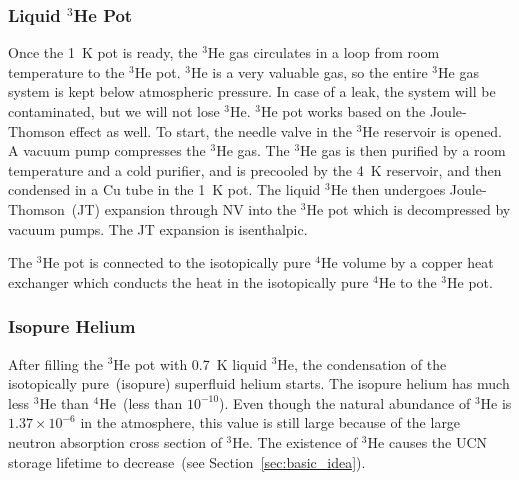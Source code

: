    

\subsubsection{Liquid $^3$He Pot}

Once the 1~K pot is ready, the $^3$He gas circulates in a loop from
room temperature to the $^3$He pot. $^3$He is a very valuable gas, so
the entire $^3$He gas system is kept below atmospheric pressure. In
case of a leak, the system will be contaminated, but we will not lose
$^3$He. $^3$He pot works based on the Joule-Thomson effect as well.
To start, the needle valve in the $^3$He reservoir is opened. A vacuum
pump compresses the $^3$He gas. The $^3$He gas is then purified by a
room temperature and a cold purifier, and is precooled by the 4~K
reservoir, and then condensed in a Cu tube in the 1~K pot. The liquid
$^3$He then undergoes Joule-Thomson~(JT) expansion through NV into the
$^3$He pot which is decompressed by vacuum pumps. The JT expansion is
isenthalpic.


The $^3$He pot is connected to the isotopically pure $^4$He volume by
a copper heat exchanger which conducts the heat in the
isotopically pure $^4$He to the $^3$He pot.



\subsubsection{Isopure Helium}
After filling the $^3$He pot with 0.7~K liquid $^3$He, the
condensation of the isotopically pure~(isopure) superfluid helium
starts. The isopure helium has much less $^3$He than $^4$He~(less than
$10^{-10}$).  Even though the natural abundance of $^3$He is
$1.37 \times 10^{-6}$ in the atmosphere, this value is still large
because of the large neutron absorption cross section of $^3$He. The
existence of $^3$He causes the UCN storage lifetime to decrease~(see
Section~\ref{sec:basic_idea}).

